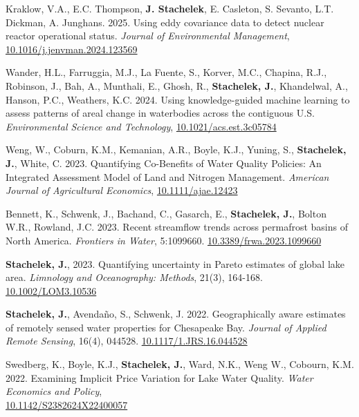 
\item Kraklow, V.A., E.C. Thompson, \textbf{J. Stachelek}, E. Casleton, S. Sevanto, L.T. Dickman, A. Junghans. 2025. Using eddy covariance data to detect nuclear reactor operational status. \emph{Journal of Environmental Management}, \href{https://doi.org/10.1016/j.jenvman.2024.123569}{10.1016/j.jenvman.2024.123569}

\item Wander, H.L., Farruggia, M.J., La Fuente, S., Korver, M.C., Chapina, R.J., Robinson, J., Bah, A., Munthali, E., Ghosh, R., \textbf{Stachelek, J.}, Khandelwal, A., Hanson, P.C., Weathers, K.C. 2024. Using knowledge-guided machine learning to assess patterns of areal change in waterbodies across the contiguous U.S. \emph{Environmental Science and Technology}, \href{https://doi.org/10.1021/acs.est.3c05784}{10.1021/acs.est.3c05784}

\item Weng, W., Coburn, K.M., Kemanian, A.R., Boyle, K.J., Yuning, S., \textbf{Stachelek, J.}, White, C. 2023. Quantifying Co-Benefits of Water Quality Policies: An Integrated Assessment Model of Land and Nitrogen Management. \emph{American Journal of Agricultural Economics}, \href{https://doi.org/10.1111/ajae.12423}{10.1111/ajae.12423}

\item Bennett, K., Schwenk, J., Bachand, C., Gasarch, E., \textbf{Stachelek, J.}, Bolton W.R., Rowland, J.C. 2023. Recent streamflow trends across permafrost basins of North America. \emph{Frontiers in Water}, 5:1099660. \href{https://doi.org/10.3389/frwa.2023.1099660}{10.3389/frwa.2023.1099660}

\item \textbf{Stachelek, J.}, 2023. Quantifying uncertainty in Pareto estimates of global lake area. \emph{Limnology and Oceanography: Methods}, 21(3), 164-168. \href{https://doi.org/10.1002/LOM3.10536}{10.1002/LOM3.10536}

\item \textbf{Stachelek, J.}, Avendaño, S., Schwenk, J. 2022. Geographically aware estimates of remotely sensed water properties for Chesapeake Bay. \emph{Journal of Applied Remote Sensing}, 16(4), 044528. \href{https://doi.org/10.1117/1.JRS.16.044528}{10.1117/1.JRS.16.044528}

\item Swedberg, K., Boyle, K.J., \textbf{Stachelek, J.}, Ward, N.K., Weng W., Cobourn, K.M. 2022. Examining Implicit Price Variation for Lake Water Quality. \emph{Water Economics and Policy}, \\ \href{https://doi.org/10.1142/S2382624X22400057}{10.1142/S2382624X22400057}

